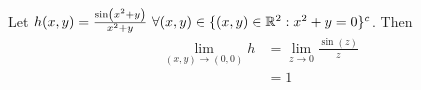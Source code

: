 Let $ h(x,y) = \frac{\sin(x^2+y)}{x^2+y} \ \forall (x,y) \in \{ (x,y)\in \R^2: x^2+y=0 \}^c $. Then
\begin{align*}
  \lim_{(x,y) \to (0,0)} h 
  &= \lim_{z \to 0} \frac{\sin(z)}{z} \\
  &= 1 \tag{$(x,y) \to (0,0) \implies z=x^2+y \to 0$}
\end{align*}
